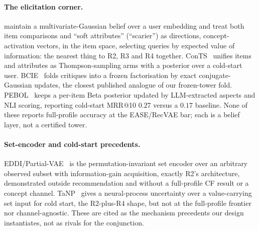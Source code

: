\documentclass[acmsmall,review,anonymous]{acmart}
\begin{document}
\paragraph{The elicitation corner.} \citet{biyik2023soft} maintain a multivariate-Gaussian belief over a user embedding and treat both item comparisons and ``soft attributes'' (``scarier'') as directions, concept-activation vectors, in the item space, selecting queries by expected value of information: the nearest thing to R2, R3 and R4 together. ConTS~\citep{li2021seamlessly} unifies items and attributes as Thompson-sampling arms with a posterior over a cold-start user. BCIE~\citep{toroghi2023bcie} folds critiques into a frozen factorisation by exact conjugate-Gaussian updates, the closest published analogue of our frozen-tower fold. PEBOL~\citep{austin2024bayesian} keeps a per-item Beta posterior updated by LLM-extracted aspects and NLI scoring, reporting cold-start MRR@10 $0.27$ versus a $0.17$ baseline. None of these reports full-profile accuracy at the EASE/RecVAE bar; each is a belief layer, not a certified tower.

\paragraph{Set-encoder and cold-start precedents.} EDDI/Partial-VAE~\citep{ma2019eddi} is the permutation-invariant set encoder over an arbitrary observed subset with information-gain acquisition, exactly R2's architecture, demonstrated outside recommendation and without a full-profile CF result or a concept channel. TaNP~\citep{lin2021tanp} gives a neural-process uncertainty over a value-carrying set input for cold start, the R2-plus-R4 shape, but not at the full-profile frontier nor channel-agnostic. These are cited as the mechanism precedents our design instantiates, not as rivals for the conjunction.
\end{document}
